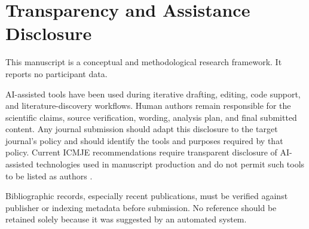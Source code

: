 \section{Transparency and Assistance Disclosure}

This manuscript is a conceptual and methodological research framework. It reports no participant data.

AI-assisted tools have been used during iterative drafting, editing, code support, and literature-discovery workflows. Human authors remain responsible for the scientific claims, source verification, wording, analysis plan, and final submitted content. Any journal submission should adapt this disclosure to the target journal's policy and should identify the tools and purposes required by that policy. Current ICMJE recommendations require transparent disclosure of AI-assisted technologies used in manuscript production and do not permit such tools to be listed as authors \parencite{icmje2026ai}.

Bibliographic records, especially recent publications, must be verified against publisher or indexing metadata before submission. No reference should be retained solely because it was suggested by an automated system.
